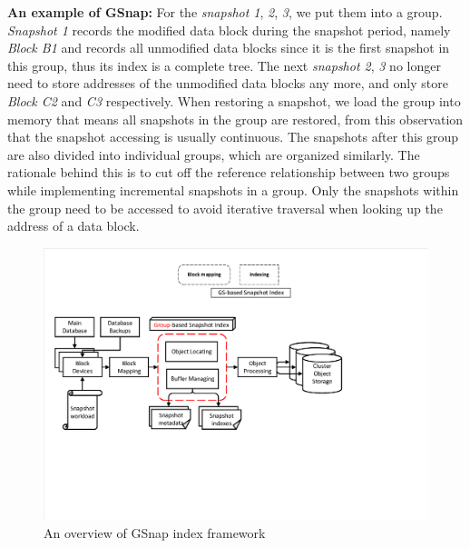 \documentclass[sigconf, nonacm]{acmart}
\begin{document}
\textbf{An example of GSnap:} For the \emph{snapshot 1}, \emph{2}, \emph{3}, we put them into a group. \emph{Snapshot 1} records the modified data block during the snapshot period, namely \emph{Block B1} and records all unmodified data blocks since it is the first snapshot in this group, thus its index is a complete tree.
The next \emph{snapshot 2}, \emph{3} no longer need to store addresses of the unmodified data blocks any more, and only store \emph{Block C2} and \emph{C3} respectively. When restoring a snapshot, we load the group into memory that means all snapshots in the group are restored, from this observation that the snapshot accessing is usually continuous. The snapshots after this group are also divided into individual groups, which are organized similarly. The rationale behind this is to cut off the reference relationship between two groups while implementing incremental snapshots in a group. Only the snapshots within the group need to be accessed to avoid iterative traversal when looking up the address of a data block.

\begin{figure}[htp]
	\centering
	\includegraphics[width=\columnwidth]{figures/ceph_pic/arch_overview.pdf}
	\caption{An overview of GSnap index framework}
	\label{fig:framework}
\end{figure}
\end{document}
